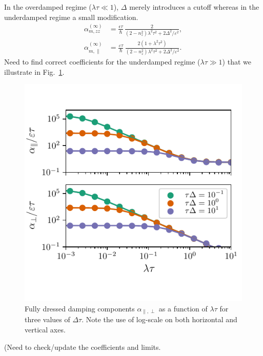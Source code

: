 In the overdamped regime ($\lambda\tau\ll1$),  $\Delta$ merely introduces a cutoff whereas in the underdamped regime a small modification.
\begin{align}
\label{eq:alphaparallelzerodelta}
    \alpha_{m,zz}^{(\infty)} &= \frac{\epsilon \tau}{\hbar}\, \frac{2}{(2-n_z^2)\lambda^2\tau^2+2\Delta^2/\varepsilon^2},\\
    \alpha_{m,\parallel}^{(\infty)} &= \frac{\varepsilon\tau}{\hbar}\,\frac{2(1+\lambda^2\tau^2)}{(2-n_z^2)\lambda^2\tau^2+2\Delta^2/\varepsilon^2}.
\end{align}
{\color{blue} Need to find correct coefficients for the underdamped regime ($\lambda\tau\gg1$)}
that we illustrate in Fig.~\ref{fig:alpha3}.
\begin{figure}
    \centering
    \includegraphics{gfx/Chapter04/alpha_plot1.pdf}
    \caption{Fully dressed damping components $\alpha_{\parallel,\perp}$ as a function of $\lambda\tau$ for three values of $\Delta\tau$. Note the use of log-scale on both horizontal and vertical axes.}
    \label{fig:alpha3}
\end{figure}
{\color{blue} (Need to check/update the coefficients and limits. }
%
%
